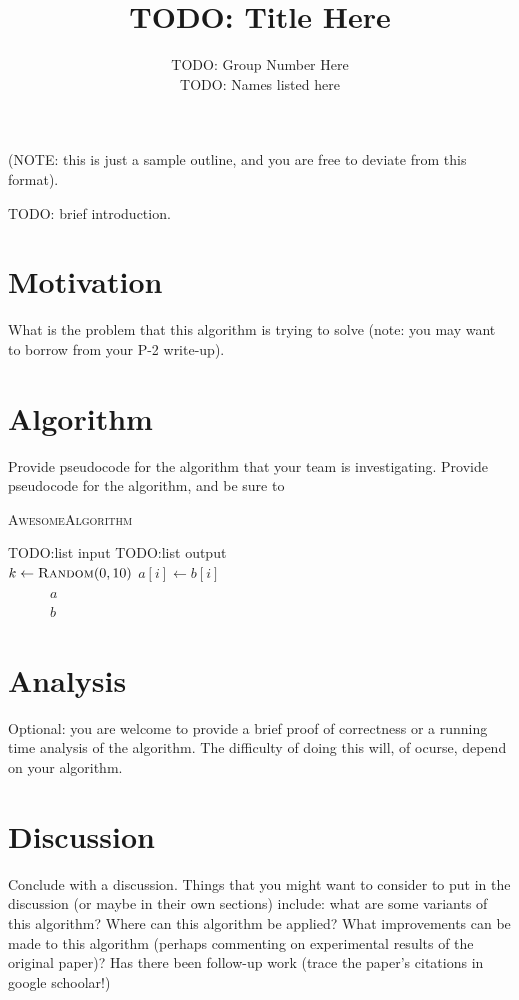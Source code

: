 \documentclass[11pt]{article}
\title{TODO: Title Here}
\author{TODO: Group Number Here \\ 
\small{TODO: Names listed here}}
\begin{document}
\maketitle

(NOTE: this is just a sample outline, and you are free to deviate from this 
format).

TODO: brief introduction.

\section{Motivation}
What is the problem that this algorithm is trying to solve (note: you may want 
to borrow from your P-2 write-up).

\section{Algorithm}
Provide pseudocode for the algorithm that your team is investigating.  Provide 
pseudocode for the algorithm, and be sure to 

\begin{algorithm}\caption{\textsc{AwesomeAlgorithm}}
 \begin{algorithmic}[1]
    TODO:list input
    TODO:list output\\
   
   \State $k \gets \textsc{Random}(0,10)$
	\State $a[i] \gets b[i]$
        \EndWhile\\
~~~~~~\Return $a$
   \Else\\
   ~~~~~~\Return $b$
   \EndIf
 \end{algorithmic}
\end{algorithm}

\section{Analysis}
Optional: you are welcome to provide a brief proof of correctness or a 
running time analysis of the algorithm.  The difficulty of doing this will, of 
ocurse, depend on your algorithm.

\section{Discussion}
Conclude with a discussion.  Things that you might want to consider to put in 
the discussion (or maybe in their own sections) include: what are some variants 
of this algorithm? Where can this algorithm be applied?  What improvements can 
be made to this algorithm (perhaps commenting on experimental results of the 
original paper)?  Has there been follow-up work (trace the paper's citations in 
google schoolar!)
\end{document}
